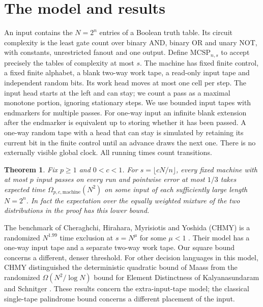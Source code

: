 \documentclass[11pt]{article}
\newtheorem{theorem}{Theorem}[section]\newtheorem{lemma}[theorem]{Lemma}\newtheorem{corollary}[theorem]{Corollary}
\begin{document}
\section{The model and results}
An input contains the $N=2^n$ entries of a Boolean truth table. Its circuit complexity is the least gate count over binary AND, binary OR and unary NOT, with constants, unrestricted fanout and one output. Define $\mathrm{MCSP}_{n,s}$ to accept precisely the tables of complexity at most $s$.
The machine has fixed finite control, a fixed finite alphabet, a blank two-way work tape, a read-only input tape and independent random bits. Its work head moves at most one cell per step. The input head starts at the left and can stay; we count a pass as a maximal monotone portion, ignoring stationary steps. We use bounded input tapes with endmarkers for multiple passes. For one-way input an infinite blank extension after the endmarker is equivalent up to storing whether it has been passed. A one-way random tape with a head that can stay is simulated by retaining its current bit in the finite control until an advance draws the next one. There is no externally visible global clock. All running times count transitions.
\begin{theorem}\label{main}
Fix $p\ge1$ and $0<c<1$. For $s=\lfloor cN/n\rfloor$, every fixed machine with at most $p$ input passes on every run and pointwise error at most $1/3$ takes expected time $\Omega_{p,c,\mathrm{machine}}(N^2)$ on some input of each sufficiently large length $N=2^n$. In fact the expectation over the equally weighted mixture of the two distributions in the proof has this lower bound.
\end{theorem}
The benchmark of Cheraghchi, Hirahara, Myrisiotis and Yoshida (CHMY) is a randomized $N^{1.99}$ time exclusion at $s=N^\mu$ for some $\mu<1$ \cite[Thm.~2]{chmy}. Their model has a one-way input tape and a separate two-way work tape. Our square bound concerns a different, denser threshold. For other decision languages in this model, CHMY \cite[\S1.3]{chmy} distinguished the deterministic quadratic bound of Maass \cite{maass} from the randomized $\Omega(N^2/\log N)$ bound for Element Distinctness of Kalyanasundaram and Schnitger \cite{ks}. These results concern the extra-input-tape model; the classical single-tape palindrome bound concerns a different placement of the input.
\end{document}
